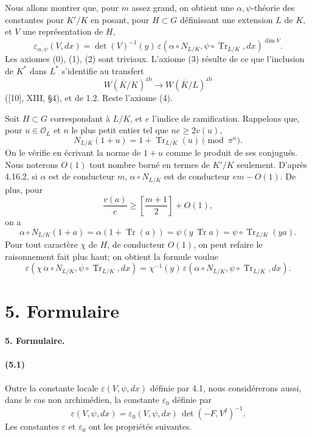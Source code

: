 \documentclass[10pt]{article}
\newcommand{\Tr}{\operatorname{Tr}}
\providecommand{\ab}{\mathrm{ab}}
\providecommand{\ab}{\mathrm{ab}}
\providecommand{\ab}{\mathrm{ab}}
\providecommand{\Tr}{\operatorname{Tr}}
\providecommand{\Tr}{\operatorname{Tr}}
\providecommand{\Tr}{\operatorname{Tr}}
\begin{document}
Nous allons montrer que, pour \(m\) assez grand, on obtient une \(\alpha,\psi\)-théorie des constantes pour \(K'/K\) en posant, pour \(H\subset G\) définissant une extension \(L\) de \(K\), et \(V\) une représentation de \(H\),
\[
\varepsilon_{\alpha,\psi}(V,dx)
=
\det(V)^{-1}(y)\,
\varepsilon(\alpha\circ N_{L/K},\psi\circ\Tr_{L/K},dx)^{\dim V}.
\]
Les axiomes (0), (1), (2) sont triviaux. L'axiome (3) résulte de ce que l'inclusion de \(K^*\) dans \(L^*\) s'identifie au transfert
\[
W(\overline K/K)^{\ab}\longrightarrow W(\overline K/L)^{\ab}
\]
([10], XIII, §4), et de 1.2. Reste l'axiome (4).

Soit \(H\subset G\) correspondant à \(L/K\), et \(e\) l'indice de ramification. Rappelons que, pour \(u\in\mathcal O_L\) et \(n\) le plus petit entier tel que \(ne\ge2v(u)\),
\[
\tag{4.16.2}
N_{L/K}(1+u)=1+\Tr_{L/K}(u)\pmod{\pi^n}.
\]
On le vérifie en écrivant la norme de \(1+u\) comme le produit de ses conjugués. Nous noterons \(O(1)\) tout nombre borné en termes de \(K'/K\) seulement. D'après 4.16.2, si \(\alpha\) est de conducteur \(m\), \(\alpha\circ N_{L/K}\) est de conducteur \(em-O(1)\). De plus, pour
\[
\frac{v(a)}e\ge \left[\frac{m+1}{2}\right]+O(1),
\]
on a
\[
\alpha\circ N_{L/K}(1+a)
=
\alpha(1+\Tr(a))
=
\psi(y\,\Tr a)
=
\psi\circ\Tr_{L/K}(ya).
\]
Pour tout caractère \(\chi\) de \(H\), de conducteur \(O(1)\), on peut refaire le raisonnement fait plus haut; on obtient la formule voulue
\[
\varepsilon(\chi\,\alpha\circ N_{L/K},\psi\circ\Tr_{L/K},dx)
=
\chi^{-1}(y)\,
\varepsilon(\alpha\circ N_{L/K},\psi\circ\Tr_{L/K},dx).
\]

\section*{5. Formulaire}

\paragraph{5. Formulaire.}

\paragraph{(5.1)} Outre la constante locale \(\varepsilon(V,\psi,dx)\) définie par 4.1, nous considérerons aussi, dans le cas non archimédien, la constante \(\varepsilon_0\) définie par
\[
\varepsilon(V,\psi,dx)
=
\varepsilon_0(V,\psi,dx)\,\det(-F,V^I)^{-1}.
\]
Les constantes \(\varepsilon\) et \(\varepsilon_0\) ont les propriétés suivantes.
\end{document}

